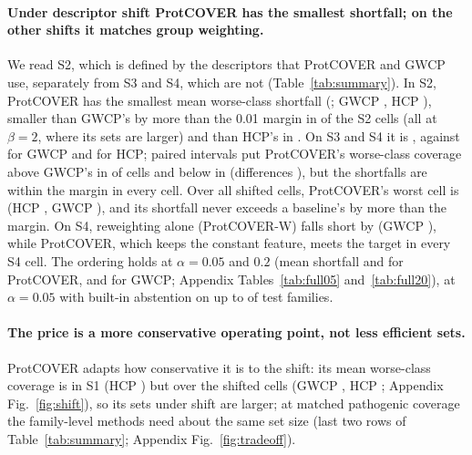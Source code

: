 \paragraph{Under descriptor shift ProtCOVER has the smallest shortfall; on the other shifts it matches group weighting.}
We read S2, which is defined by the descriptors that ProtCOVER and GWCP use, separately from S3 and S4, which are not (Table~\ref{tab:summary}). In S2, ProtCOVER has the smallest mean worse-class shortfall (\shortCrTwoMean{}; GWCP \shortGwcpTwoMean{}, HCP \shortHcpTwoMean{}), smaller than GWCP's by more than the 0.01 margin in \marginCrGwcpBetterTwo{} of the \nShiftCellsTwo{} S2 cells (all at $\beta=2$, where its sets are larger) and than HCP's in \marginCrHcpBetterTwo{}. On S3 and S4 it is \shortCrIndMean{}, against \shortGwcpIndMean{} for GWCP and \shortHcpIndMean{} for HCP; paired intervals put ProtCOVER's worse-class coverage above GWCP's in \pairCrGwcpWorsePosInd{} of \nShiftCellsInd{} cells and below in \pairCrGwcpWorseNegInd{} (differences \pairCrGwcpWorseRangeInd{}), but the shortfalls are within the margin in every cell. Over all \nShiftCells{} shifted cells, ProtCOVER's worst cell is \worstCrFine{} (HCP \worstHcp{}, GWCP \worstGwcp{}), and its shortfall never exceeds a baseline's by more than the margin. On S4, reweighting alone (ProtCOVER-W) falls short by \shortPwFourMean{} (GWCP \shortGwcpFourMean{}), while ProtCOVER, which keeps the constant feature, meets the target in every S4 cell. The ordering holds at $\alpha=0.05$ and $0.2$ (mean shortfall \shortCrMeanFive{} and \shortCrMeanTwenty{} for ProtCOVER, \shortGwcpMeanFive{} and \shortGwcpMeanTwenty{} for GWCP; Appendix Tables~\ref{tab:full05} and~\ref{tab:full20}), at $\alpha=0.05$ with built-in abstention on up to \condAbstainMaxFive{} of test families.

\paragraph{The price is a more conservative operating point, not less efficient sets.}
ProtCOVER adapts how conservative it is to the shift: its mean worse-class coverage is \sOneMeanWorstCr{} in S1 (HCP \sOneMeanWorstHcp{}) but \meanWorstCr{} over the shifted cells (GWCP \meanWorstGwcp{}, HCP \meanWorstHcp{}; Appendix Fig.~\ref{fig:shift}), so its sets under shift are larger; at matched pathogenic coverage the family-level methods need about the same set size (last two rows of Table~\ref{tab:summary}; Appendix Fig.~\ref{fig:tradeoff}).

